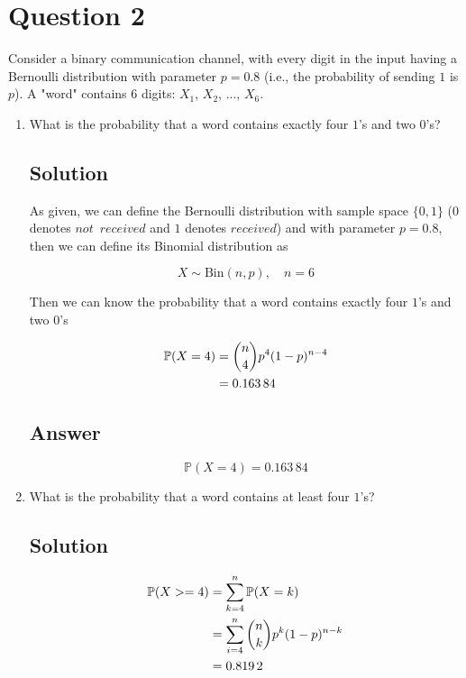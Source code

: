 \documentclass[12pt]{article}
\newcommand{\bP}{\mathbb{P}}
\begin{document}
	
	\section*{Question 2}
	
	\noindent Consider a binary communication channel, with every digit in the input having a Bernoulli distribution with parameter $p = 0.8$ (i.e., the probability of sending $1$ is $p$). A "word" contains 6 digits: $X_1$, $X_2$, ..., $X_6$.
	
	\bigskip
	
	\begin{enumerate}[start=1,label={\bfseries Part \arabic*:},leftmargin=0in]
		\bigskip\item What is the probability that a word contains exactly four $1$'s and two $0$'s?
		
		\subsection*{Solution}
		
			As given, we can define the Bernoulli distribution with sample space $\{0,1\}$ ($0$ denotes $not\enspace received$ and $1$ denotes $received$) and with parameter $p = 0.8$, then we can define its Binomial distribution as
			
			\[X\sim \text{Bin}(n,p),\quad n = 6\]
			
			Then we can know the probability that a word contains exactly four $1$'s and two $0$'s
			
			\[
			\begin{aligned}
				\bP(X = 4) &= \dbinom{n}{4}p^4(1-p)^{n-4}\\
				&= 0.163\,84
			\end{aligned}
			\]
		
		\subsection*{Answer}
		
			\[\boxed{\bP(X = 4) = 0.163\,84}\]
		
		\bigskip\item What is the probability that a word contains at least four $1$'s?
		
		\subsection*{Solution}
		
			\[
			\begin{aligned}
				\bP(X >= 4) &= \sum_{k = 4}^n\bP(X = k)\\
				&= \sum_{i = 4}^n\dbinom{n}{k}p^k(1-p)^{n-k}\\
				&= 0.819\,2
			\end{aligned}
			\]
		

\end{enumerate}
\end{document}
